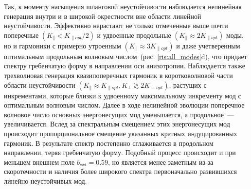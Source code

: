 Так, к моменту насыщения шланговой неустойчивости наблюдается нелинейная генерация внутри и в широкой окрестности вне области линейной неустойчивости. Эффективно нарастают не только отмеченные выше почти поперечные $\left(K_\|<K_{\|opt}/2\right)$ и удвоенные продольные $\left(K_\|\approx2K_{\|opt}\right)$ моды, но и гармоники с примерно утроенным $\left(K_\|\approx3K_{\|opt}\right)$ и даже учетверенным оптимальным продольным волновым числом~(рис. \ref{ris:all_modes}d), что придает спектру гребенчатую форму в направлении оси анизотропии. Наблюдается также трехволновая генерация квазипоперечных гармоник в коротковолновой части области неустойчивости $\left(K_\|\approx K_{\|opt},K_\perp\gtrsim2K_{\perp opt}\right)$, растущих с инкрементами, которые близки к удвоенному максимальному инкременту мод с оптимальным волновым числом. Далее в ходе нелинейной эволюции поперечное волновое число основных энергонесущих мод уменьшается, а продольное~--- увеличивается. Вслед за спектральным смещением этих энергонесущих мод происходит пропорциональное смещение указанных кратных индуцированных гармоник. В результате спектр постепенно сглаживается в продольном направлении, теряя гребенчатую форму. Подобный процесс происходит и при меньшем внешнем поле $b_{ext}=0.59$, но является менее заметным из-за скоротечности и наличия более широкого спектра первоначально развившихся линейно неустойчивых мод.



